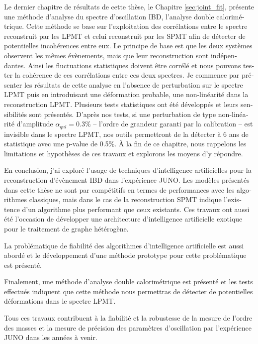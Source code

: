 \documentclass[../main.tex]{subfiles}
\begin{document}
\begin{otherlanguage}{french}
Le dernier chapitre de résultats de cette thèse, le Chapitre \ref{sec:joint_fit}, présente une méthode d'analyse du spectre d'oscillation IBD, l'analyse double calorimétrique. Cette méthode se base sur l'exploitation des corrélations entre le spectre reconstruit par les LPMT et celui reconstruit par les SPMT afin de détecter de potentielles incohérences entre eux. Le principe de base est que les deux systèmes observent les mêmes évènements, mais que leur reconstruction sont indépendantes. Ainsi les fluctuations statistiques doivent être corrélé et nous pouvons tester la cohérence de ces corrélations entre ces deux spectres. Je commence par présenter les résultats de cette analyse en l'absence de perturbation sur le spectre LPMT puis en introduisant une déformation probable, une non-linéarité dans la reconstruction LPMT. Plusieurs tests statistiques ont été développés et leurs sensibilités sont présentés. D'après nos tests, si une perturbation de type non-linéarité d'amplitude $\alpha_{qnl} = 0.3\%$ -- l'ordre de grandeur garanti par la calibration --  est invisible dans le spectre LPMT, nos outils permettront de la détecter à 6 ans de statistique avec une p-value de 0.5\%. À la fin de ce chapitre, nous rappelons les limitations et hypothèses de ces travaux et explorons les moyens d'y répondre.

\hfill

En conclusion, j'ai exploré l'usage de techniques d'intelligence artificielles pour la reconstruction d'évènement IBD dans l'expérience JUNO. Les modèles présentés dans cette thèse ne sont par compétitifs en termes de performances avec les algorithmes classiques, mais dans le cas de la reconstruction SPMT indique l'existence d'un algorithme plus performant que ceux existants. Ces travaux ont aussi été l'occasion de développer une architecture d'intelligence artificielle exotique pour le traitement de graphe hétérogène.

La problématique de fiabilité des algorithmes d'intelligence artificielle est aussi abordé et le développement d'une méthode prototype pour cette problématique est présenté.

Finalement, une méthode d'analyse double calorimétrique est présenté et les tests effectués indiquent que cette méthode nous permettras de détecter de potentielles déformations dans le spectre LPMT.

Tous ces travaux contribuent à la fiabilité et la robustesse de la mesure de l'ordre des masses et la mesure de précision des paramètres d'oscillation par l'expérience JUNO dans les années à venir.

\end{otherlanguage}
\end{document}
